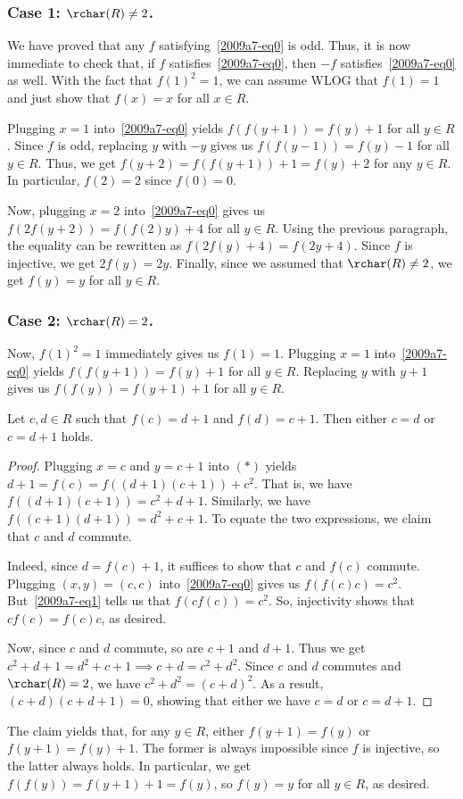 \subsubsection*{Case 1: $\rchar(R) \neq 2$.}

We have proved that any $f$ satisfying~\eqref{2009a7-eq0} is odd.
Thus, it is now immediate to check that, if $f$ satisfies~\eqref{2009a7-eq0}, then $-f$ satisfies~\eqref{2009a7-eq0} as well.
With the fact that $f(1)^2 = 1$, we can assume WLOG that $f(1) = 1$ and just show that $f(x) = x$ for all $x \in R$.

Plugging $x = 1$ into~\eqref{2009a7-eq0} yields $f(f(y + 1)) = f(y) + 1$ for all $y \in R$.
Since $f$ is odd, replacing $y$ with $-y$ gives us $f(f(y - 1)) = f(y) - 1$ for all $y \in R$.
Thus, we get $f(y + 2) = f(f(y + 1)) + 1 = f(y) + 2$ for any $y \in R$.
In particular, $f(2) = 2$ since $f(0) = 0$.

Now, plugging $x = 2$ into~\eqref{2009a7-eq0} gives us $f(2 f(y + 2)) = f(f(2) y) + 4$ for all $y \in R$.
Using the previous paragraph, the equality can be rewritten as $f(2 f(y) + 4) = f(2y + 4)$.
Since $f$ is injective, we get $2 f(y) = 2y$.
Finally, since we assumed that $\rchar(R) \neq 2$, we get $f(y) = y$ for all $y \in R$.


\subsubsection*{Case 2: $\rchar(R) = 2$.}

Now, $f(1)^2 = 1$ immediately gives us $f(1) = 1$.
Plugging $x = 1$ into~\eqref{2009a7-eq0} yields $f(f(y + 1)) = f(y) + 1$ for all $y \in R$.
Replacing $y$ with $y + 1$ gives us $f(f(y)) = f(y + 1) + 1$ for all $y \in R$.

\begin{claim}
Let $c, d \in R$ such that $f(c) = d + 1$ and $f(d) = c + 1$.
Then either $c = d$ or $c = d + 1$ holds.
\end{claim}
\begin{proof}
Plugging $x = c$ and $y = c + 1$ into $(*)$ yields $d + 1 = f(c) = f((d + 1)(c + 1)) + c^2$.
That is, we have $f((d + 1)(c + 1)) = c^2 + d + 1$.
Similarly, we have $f((c + 1)(d + 1)) = d^2 + c + 1$.
To equate the two expressions, we claim that $c$ and $d$ commute.

Indeed, since $d = f(c) + 1$, it suffices to show that $c$ and $f(c)$ commute.
Plugging $(x, y) = (c, c)$ into~\eqref{2009a7-eq0} gives us $f(f(c) c) = c^2$.
But~\eqref{2009a7-eq1} tells us that $f(c f(c)) = c^2$.
So, injectivity shows that $c f(c) = f(c) c$, as desired.

Now, since $c$ and $d$ commute, so are $c + 1$ and $d + 1$.
Thus we get $c^2 + d + 1 = d^2 + c + 1 \implies c + d = c^2 + d^2$.
Since $c$ and $d$ commutes and $\rchar(R) = 2$, we have $c^2 + d^2 = (c + d)^2$.
As a result, $(c + d)(c + d + 1) = 0$, showing that either we have $c = d$ or $c = d + 1$.
\end{proof}

The claim yields that, for any $y \in R$, either $f(y + 1) = f(y)$ or $f(y + 1) = f(y) + 1$.
The former is always impossible since $f$ is injective, so the latter always holds.
In particular, we get $f(f(y)) = f(y + 1) + 1 = f(y)$, so $f(y) = y$ for all $y \in R$, as desired.
